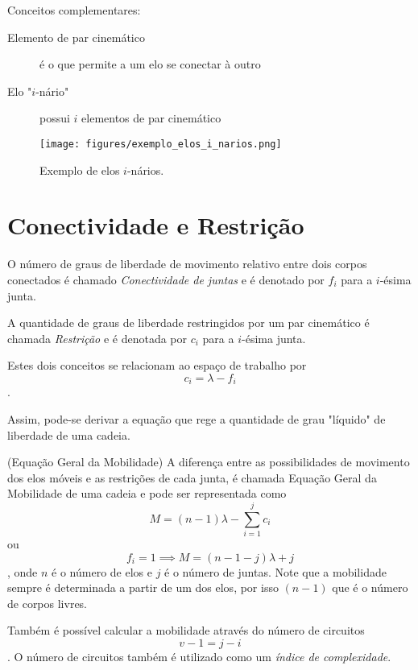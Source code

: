
Conceitos complementares:
\begin{description}
    \item[Elemento de par cinemático] é o que permite a um elo se conectar à outro
    \item[Elo "$i$-nário"] possui $i$ elementos de par cinemático
\end{description}

\begin{figure}[H]
    \centering
    \texttt{[image: figures/exemplo\_elos\_i\_narios.png]}
    \caption{Exemplo de elos $i$-nários.}
    \label{fig:figures-exemplo_elos_i_narios-png}
\end{figure}

\section*{Conectividade e Restrição}

\begin{definition}
    O número de graus de liberdade de movimento relativo entre dois corpos conectados é chamado \emph{Conectividade de juntas} e é denotado por $f_i$ para a $i$-ésima junta.

    A quantidade de graus de liberdade restringidos por um par cinemático é chamada \emph{Restrição} e é denotada por $c_i$ para a $i$-ésima junta.

    Estes dois conceitos se relacionam ao espaço de trabalho por \[
    c_i = \lambda - f_i
    \].
\end{definition}

Assim, pode-se derivar a equação que rege a quantidade de grau "líquido" de liberdade de uma cadeia.

\begin{definition}
    (Equação Geral da Mobilidade) A diferença entre as possibilidades de movimento dos elos móveis e as restrições de cada junta, é chamada Equação Geral da Mobilidade de uma cadeia e pode ser representada como \[
    M = \left( n-1 \right) \lambda - \sum_{i=1}^{j} c_i
\] ou \[
f_i = 1 \implies M = \left( n-1-j \right) \lambda + j
\], onde $n$ é o número de elos e $j$ é o número de juntas. Note que a mobilidade sempre é determinada a partir de um dos elos, por isso $(n-1)$ que é o número de corpos livres.
\end{definition}

\begin{note}
    Também é possível calcular a mobilidade através do número de circuitos \[
    v -1 = j - i
    \]. O número de circuitos também é utilizado como um \emph{índice de complexidade}.
\end{note}
